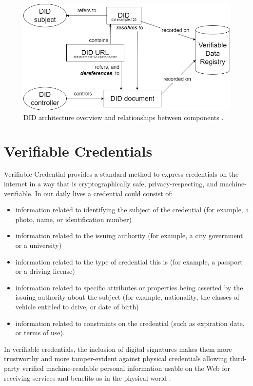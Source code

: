 \begin{figure}[h!]
    \centering
    \includegraphics[width=12cm]{./chapters/images/did-overview.png}
    \caption{DID architecture overview and relationships between components \cite{didW3C}.}
    \label{didOverview}
\end{figure}

\section{Verifiable Credentials}
Verifiable Credential \cite{vcW3C} provides a standard method to express credentials on the internet in a way that is cryptographically safe, privacy-respecting, and machine-verifiable.
In our daily lives a credential could consist of:
\begin{itemize}
    \item information related to identifying the subject of the credential (for example, a photo, name, or identification number)
    \item information related to the issuing authority (for example, a city government or a university)
    \item information related to the type of credential this is (for example, a passport or a driving license)
    \item information related to specific attributes or properties being asserted by the issuing authority about the subject (for example, nationality, the classes of vehicle entitled to drive, or date of birth)
    \item information related to constraints on the credential (such as expiration date, or terms of use). 
\end{itemize}

In verifiable credentials, the inclusion of digital signatures makes them more trustworthy and more tamper-evident against physical credentials allowing third-party verified machine-readable personal information usable on the Web for receiving services and benefits as in the physical world \cite{vcW3C}.

